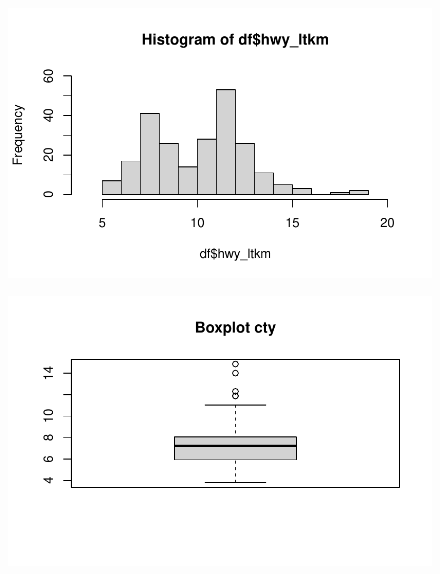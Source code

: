 \documentclass[
  letterpaper,
  DIV=11,
  numbers=noendperiod]{scrreprt}
\newenvironment{Shaded}{\begin{snugshade}}{\end{snugshade}}
\newcommand{\AttributeTok}[1]{\textcolor[rgb]{0.40,0.45,0.13}{#1}}
\newcommand{\CommentTok}[1]{\textcolor[rgb]{0.37,0.37,0.37}{#1}}
\newcommand{\FunctionTok}[1]{\textcolor[rgb]{0.28,0.35,0.67}{#1}}
\newcommand{\NormalTok}[1]{\textcolor[rgb]{0.00,0.23,0.31}{#1}}
\newcommand{\SpecialCharTok}[1]{\textcolor[rgb]{0.37,0.37,0.37}{#1}}
\newcommand{\StringTok}[1]{\textcolor[rgb]{0.13,0.47,0.30}{#1}}
\begin{document}
\begin{figure}[H]

{\centering \includegraphics{data_analysis_files/figure-pdf/unnamed-chunk-2-2.pdf}

}

\end{figure}

\begin{Shaded}
\end{Shaded}

\begin{figure}[H]

{\centering \includegraphics{data_analysis_files/figure-pdf/unnamed-chunk-2-3.pdf}

}

\end{figure}
\end{document}
